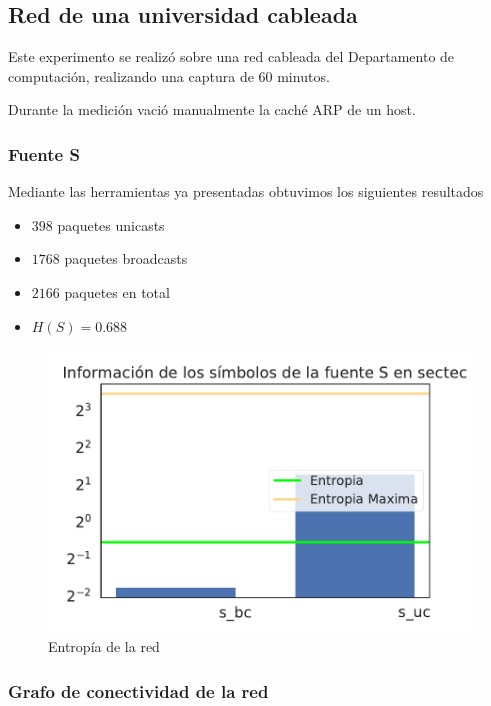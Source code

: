 
\subsection{Red de una universidad cableada}

Este experimento se realizó sobre una red cableada del Departamento de computación, realizando una captura de 60 minutos. 

Durante la medición vació manualmente la caché ARP de un host.


\subsubsection{Fuente S}


Mediante las herramientas ya presentadas obtuvimos los siguientes resultados

\begin{itemize}
 \item $398$ paquetes unicasts
 \item $1768$ paquetes broadcasts
 \item $2166$ paquetes en total
 \item $H(S) = 0.688$
\end{itemize}


\begin{figure}[H]
   \centering
       \includegraphics[page=1,width=.70\textwidth]{../img/barras-sectec}
 \caption{Entropía de la red}
 \label{fig:barras-sectec}
\end{figure}


 \subsubsection{Grafo de conectividad de la red}


